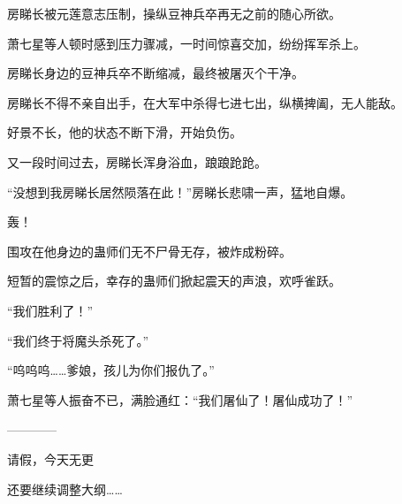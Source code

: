 \begin{this_body}
房睇长被元莲意志压制，操纵豆神兵卒再无之前的随心所欲。

萧七星等人顿时感到压力骤减，一时间惊喜交加，纷纷挥军杀上。

房睇长身边的豆神兵卒不断缩减，最终被屠灭个干净。

房睇长不得不亲自出手，在大军中杀得七进七出，纵横捭阖，无人能敌。

好景不长，他的状态不断下滑，开始负伤。

又一段时间过去，房睇长浑身浴血，踉踉跄跄。

“没想到我房睇长居然陨落在此！”房睇长悲啸一声，猛地自爆。

轰！

围攻在他身边的蛊师们无不尸骨无存，被炸成粉碎。

短暂的震惊之后，幸存的蛊师们掀起震天的声浪，欢呼雀跃。

“我们胜利了！”

“我们终于将魔头杀死了。”

“呜呜呜……爹娘，孩儿为你们报仇了。”

萧七星等人振奋不已，满脸通红：“我们屠仙了！屠仙成功了！”

------------

请假，今天无更

还要继续调整大纲……

\end{this_body}

